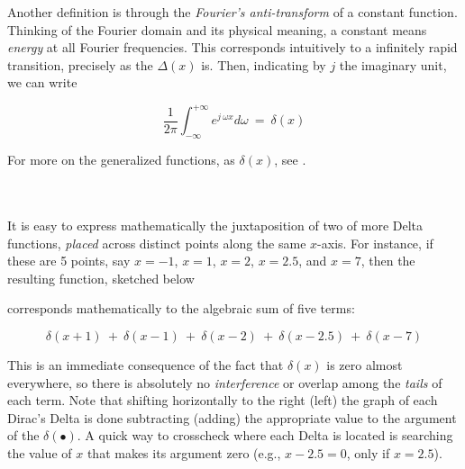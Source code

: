 \begin{svgraybox}
	Another definition is through the \textit{Fourier's anti-transform} of a constant function. Thinking of the Fourier domain and its physical meaning, a constant means \textit{energy} at all Fourier frequencies. This corresponds intuitively to a infinitely rapid transition, precisely as the \(\Delta(x)\) is. Then, indicating by \(j\) the imaginary unit, we can write

	\begin{equation}
		\frac{1}{2\pi} \int_{ -\infty}^{ +\infty} e^{ j\ \omega x} d\omega \ =\ \delta(x)
	\end{equation}	

	For more on the generalized functions, as \(\delta(x)\), see \cite{Saichev:2013}.
\end{svgraybox}	




\newpage
\begin{svgraybox}
	\\
	\\
	It is easy to express mathematically the juxtaposition of two of more Delta functions, \textit{placed} across distinct points along the same \(x\)-axis. For instance, if these are 5 points, say \(x = - 1\), \(x =	1\), \(x = 2\), \(x = 2.5\), and \(x = 7\), then the resulting function, sketched below
	
  
  corresponds mathematically to the algebraic sum of five terms:

  \begin{equation}
	\delta(x + 1)\ +\ \delta(x - 1)\ +\ \delta(x - 2)\ +\ \delta(x - 2.5)\ +\ \delta(x - 7)
  \end{equation}
  
  This is an immediate consequence of the fact that \(\delta(x)\) is zero almost everywhere, so there is absolutely no \textit{interference} or overlap among the \textit{tails} of each term. Note that shifting horizontally to the right (left) the graph of each Dirac's Delta is done subtracting (adding) the appropriate value to the argument of the \(\delta( \bullet )\). A quick way to crosscheck where each Delta is located is searching the value of $x$ that makes its argument zero (e.g., \(x - 2.5 = 0\), only if \(x = 2.5\)).

\end{svgraybox}	
 




